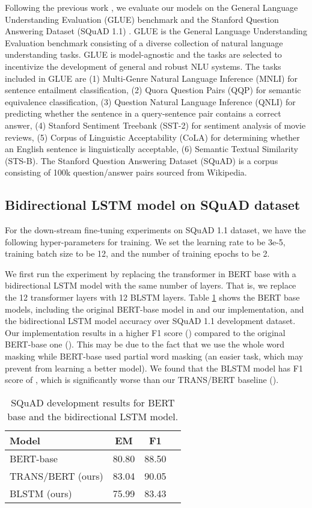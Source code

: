 \documentclass[11pt,a4paper]{article}
\begin{document}
Following the previous work \cite{devlin2018,yang2019,liu2019,lan2019}, we evaluate our models on the General Language Understanding Evaluation (GLUE) benchmark \cite{wang2018} and the Stanford Question Answering Dataset (SQuAD 1.1) \cite{rajpurkar2016}. GLUE is the General Language Understanding Evaluation benchmark consisting of a diverse collection of natural language understanding tasks. GLUE is model-agnostic and the tasks are selected to incentivize the development of general and robust NLU systems. The tasks included in GLUE are (1) Multi-Genre Natural Language Inference (MNLI) for sentence entailment classification, (2) Quora Question Pairs (QQP) for semantic equivalence classification, (3) Question Natural Language Inference (QNLI) for predicting whether the sentence in a query-sentence pair contains a correct answer, (4) Stanford Sentiment Treebank (SST-2) for sentiment analysis of movie reviews, (5) Corpus of Linguistic Acceptability (CoLA) for determining whether an English sentence is linguistically acceptable, (6) Semantic Textual Similarity (STS-B). The Stanford Question Answering Dataset (SQuAD) is a corpus consisting of 100k question/answer pairs sourced from Wikipedia.

\subsection{Bidirectional LSTM model on SQuAD dataset} \label{sec:blstm}
For the down-stream fine-tuning experiments on SQuAD 1.1 dataset, we have the following hyper-parameters for training. We set the learning rate to be 3e-5, training batch size to be 12, and the number of training epochs to be 2. 

We first run the experiment by replacing the transformer in BERT base with a bidirectional LSTM model with the same number of layers. That is, we replace the 12 transformer layers with 12 BLSTM layers. Table \ref{tab:squadBLSTM} shows the BERT base models, including the original BERT-base model in \cite{devlin2018} and our implementation, and the bidirectional LSTM model accuracy over SQuAD 1.1 development dataset. Our implementation results in a higher F1 score () compared to the original BERT-base one (). This may be due to the fact that we use the whole word masking while BERT-base used partial word masking (an easier task, which may prevent from learning a better model). We found that the BLSTM model has F1 score of , which is significantly worse than our TRANS/BERT baseline ().

\begin{table}[!hbpt]
\centering
    \begin{tabular}{lccc}
  Model & EM & F1 \\ \hline
  BERT-base \cite{devlin2018} & 80.80 & 88.50 \\
   TRANS/BERT (ours) & 83.04 & 90.05\\
   BLSTM (ours) & 75.99 & 83.43 \\ \hline
\end{tabular}
    \caption{SQuAD development results for BERT base and the bidirectional LSTM model.}
\label{tab:squadBLSTM}
\end{table} 
\end{document}
